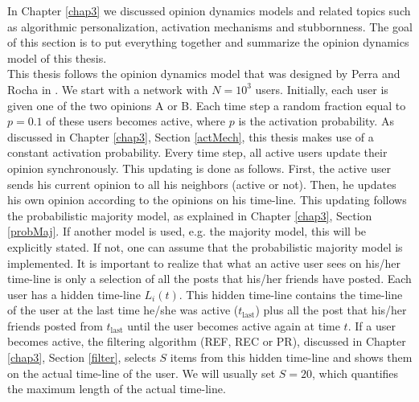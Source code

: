 \documentclass[11 pt , letterpaper , twoside , openright]{book}
\begin{document}
In Chapter \ref{chap3} we discussed opinion dynamics models and related topics such as algorithmic personalization, activation mechanisms and stubbornness. The goal of this section is to put everything together and summarize the opinion dynamics model of this thesis.\\
\newline
This thesis follows the opinion dynamics model that was designed by Perra and Rocha in \cite{Perra2019}. We start with a network with $N = 10^3$ users. Initially, each user is given one of the two opinions A or B. Each time step a random fraction equal to $p= 0.1$ of these users becomes active, where $p$ is the activation probability. As discussed in Chapter \ref{chap3}, Section \ref{actMech}, this thesis makes use of a constant activation probability. Every time step, all active users update their opinion synchronously. This updating is done as follows. First, the active user sends his current opinion to all his neighbors (active or not). Then, he updates his own opinion according to the opinions on his time-line. This updating follows the probabilistic majority model, as explained in Chapter \ref{chap3}, Section \ref{probMaj}. If another model is used, e.g. the majority model, this will be explicitly stated. If not, one can assume that the probabilistic majority model is implemented. It is important to realize that what an active user sees on his/her time-line is only a selection of all the posts that his/her friends have posted. Each user has a hidden time-line $L_i(t)$. This hidden time-line contains the time-line of the user at the last time he/she was active ($t_{\text{last}}$) plus all the post that his/her friends posted from $t_{\text{last}}$ until the user becomes active again at time $t$. If a user becomes active, the filtering algorithm (REF, REC or PR), discussed in Chapter \ref{chap3}, Section \ref{filter}, selects $S$ items from this hidden time-line and shows them on the actual time-line of the user. We will usually set $S = 20$, which quantifies the maximum length of the actual time-line.\\
\end{document}
